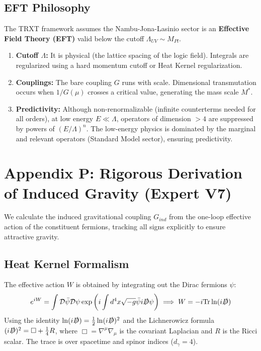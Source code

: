 \documentclass[a4paper,12pt]{article}
\begin{document}
\subsection{EFT Philosophy}
The TRXT framework assumes the Nambu-Jona-Lasinio sector is an \textbf{Effective Field Theory (EFT)} valid below the cutoff $\Lambda_{UV} \sim M_{Pl}$.
\begin{enumerate}
    \item \textbf{Cutoff $\Lambda$:} It is physical (the lattice spacing of the logic field). Integrals are regularized using a hard momentum cutoff or Heat Kernel regularization.
    \item \textbf{Couplings:} The bare coupling $G$ runs with scale. Dimensional transmutation occurs when $1/G(\mu)$ crosses a critical value, generating the mass scale $M^*$.
    \item \textbf{Predictivity:} Although non-renormalizable (infinite counterterms needed for all orders), at low energy $E \ll \Lambda$, operators of dimension $>4$ are suppressed by powers of $(E/\Lambda)^n$. The low-energy physics is dominated by the marginal and relevant operators (Standard Model sector), ensuring predictivity.
\end{enumerate}

\section{Appendix P: Rigorous Derivation of Induced Gravity (Expert V7)}

We calculate the induced gravitational coupling $G_{ind}$ from the one-loop effective action of the constituent fermions, tracking all signs explicitly to ensure attractive gravity.

\subsection{Heat Kernel Formalism}
The effective action $W$ is obtained by integrating out the Dirac fermions $\psi$:
\begin{equation}
    e^{iW} = \int \mathcal{D}\bar{\psi}\mathcal{D}\psi \exp\left( i \int d^4x \sqrt{-g} \bar{\psi} i \slashed{D} \psi \right) \implies W = -i \text{Tr} \ln (i\slashed{D})
\end{equation}
Using the identity $\ln (i\slashed{D}) = \frac{1}{2} \ln (i\slashed{D})^2$ and the Lichnerowicz formula $(i\slashed{D})^2 = \Box + \frac{1}{4}R$, where $\Box = \nabla^\mu \nabla_\mu$ is the covariant Laplacian and $R$ is the Ricci scalar. The trace is over spacetime and spinor indices ($d_\gamma = 4$).
\end{document}
